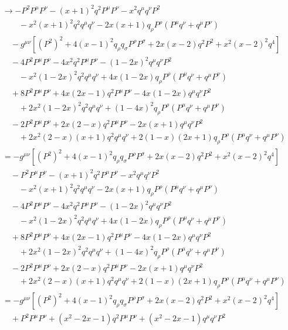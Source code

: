 \begin{align*}
  &\to - P^2 P^\mu P^\nu - (x+1)^2 q^2 P^\mu P^\nu - x^2 q^\mu q^\nu P^2 \\
  &\qquad - x^2(x+1)^2 q^2 q^\mu q^\nu - 2x(x+1) q_\rho P^\rho (P^\mu q^\nu + q^\mu P^\nu) \\
  &\quad - g^{\mu\nu} \left[ (P^2)^2 + 4(x-1)^2 q_\rho q_\sigma P^\rho P^\sigma + 2x(x-2) q^2 P^2 + x^2(x-2)^2 q^4 \right] \\
  &\quad - 4P^2 P^\mu P^\nu - 4x^2 q^2 P^\mu P^\nu - (1-2x)^2 q^\mu q^\nu P^2 \\
  &\qquad - x^2 (1-2x)^2 q^2 q^\mu q^\nu + 4x(1-2x) q_\rho P^\rho (P^\mu q^\nu + q^\mu P^\nu) \\
  &\quad + 8 P^2 P^\mu P^\nu + 4x(2x-1)q^2 P^\mu P^\nu - 4x(1-2x) q^\mu q^\nu P^2 \\
  & \qquad + 2x^2(1-2x)^2 q^2 q^\mu q^\nu + (1-4x)^2 q_\rho P^\rho (P^\mu q^\nu + q^\mu P^\nu) \\
  &\quad -2 P^2 P^\mu P^\nu + 2x(2-x)q^2 P^\mu P^\nu - 2x(x+1) q^\mu q^\nu P^2 \\
  & \qquad + 2x^2(2-x)(x+1) q^2 q^\mu q^\nu + 2(1-x)(2x+1) q_\rho P^\rho (P^\mu q^\nu + q^\mu P^\nu) \\
  &= - g^{\mu\nu} \left[ (P^2)^2 + 4(x-1)^2 q_\rho q_\sigma P^\rho P^\sigma + 2x(x-2) q^2 P^2 + x^2(x-2)^2 q^4 \right] \\
  &\quad - P^2 P^\mu P^\nu - (x+1)^2 q^2 P^\mu P^\nu - x^2 q^\mu q^\nu P^2 \\
  &\qquad - x^2(x+1)^2 q^2 q^\mu q^\nu - 2x(x+1) q_\rho P^\rho (P^\mu q^\nu + q^\mu P^\nu) \\
  &\quad - 4P^2 P^\mu P^\nu - 4x^2 q^2 P^\mu P^\nu - (1-2x)^2 q^\mu q^\nu P^2 \\
  &\qquad - x^2 (1-2x)^2 q^2 q^\mu q^\nu + 4x(1-2x) q_\rho P^\rho (P^\mu q^\nu + q^\mu P^\nu) \\
  &\quad + 8 P^2 P^\mu P^\nu + 4x(2x-1)q^2 P^\mu P^\nu - 4x(1-2x) q^\mu q^\nu P^2 \\
  & \qquad + 2x^2(1-2x)^2 q^2 q^\mu q^\nu + (1-4x)^2 q_\rho P^\rho (P^\mu q^\nu + q^\mu P^\nu) \\
  &\quad -2 P^2 P^\mu P^\nu + 2x(2-x)q^2 P^\mu P^\nu - 2x(x+1) q^\mu q^\nu P^2 \\
  & \qquad + 2x^2(2-x)(x+1) q^2 q^\mu q^\nu + 2(1-x)(2x+1) q_\rho P^\rho (P^\mu q^\nu + q^\mu P^\nu) \\
  &= - g^{\mu\nu} \left[ (P^2)^2 + 4(x-1)^2 q_\rho q_\sigma P^\rho P^\sigma + 2x(x-2) q^2 P^2 + x^2(x-2)^2 q^4 \right] \\
  &\quad + P^2 P^\mu P^\nu + (x^2-2x-1) q^2 P^\mu P^\nu + (x^2-2x-1) q^\mu q^\nu P^2 \\

\end{align*}
